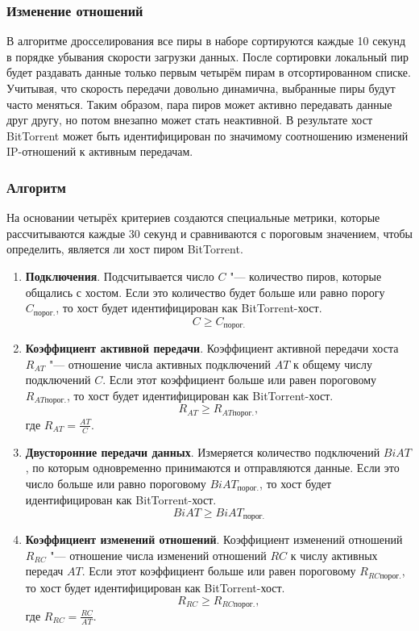 \documentclass[bachelor, och, coursework]{SCWorks}
\begin{document}
\subsubsection{Изменение отношений}
В алгоритме дросселирования все пиры в наборе сортируются каждые 10 секунд в порядке убывания скорости загрузки данных.
После сортировки локальный пир будет раздавать данные только первым четырём пирам в отсортированном списке.
Учитывая, что скорость передачи довольно динамична, выбранные пиры будут часто меняться. Таким образом, пара пиров
может активно передавать данные друг другу, но потом внезапно может стать неактивной. В результате хост BitTorrent может
быть идентифицирован по значимому соотношению изменений IP-отношений к активным передачам.

\subsubsection{Алгоритм}
На основании четырёх критериев создаются специальные метрики, которые рассчитываются каждые 30 секунд
и сравниваются с пороговым значением, чтобы определить, является ли хост пиром BitTorrent. 

\begin{enumerate}
    \item \textbf{Подключения}. Подсчитывается число $C$ "--- количество пиров, которые общались с хостом. Если это количество будет больше или равно порогу $C_{\text{порог.}}$, то хост будет идентифицирован как BitTorrent-хост.
    \[ C \geq C_{\text{порог.}} \]
    
    \item \textbf{Коэффициент активной передачи}. Коэффициент активной передачи хоста $R_{AT}$ "--- отношение числа активных подключений $AT$ к общему числу подключений $C$.
    Если этот коэффициент больше или равен пороговому $R_{AT\text{порог.}}$, то хост будет идентифицирован как BitTorrent-хост.
    \[ R_{AT} \geq R_{AT\text{порог.}}, \]
    где $R_{AT} = \frac{AT}{C}$.

    \item \textbf{Двусторонние передачи данных}. Измеряется количество подключений $BiAT$, по которым одновременно принимаются и отправляются данные. 
    Если это число больше или равно пороговому $BiAT_{\text{порог.}}$, то хост будет идентифицирован как BitTorrent-хост.
    \[ BiAT \geq BiAT_{\text{порог.}} \]

    \item \textbf{Коэффициент изменений отношений}. Коэффициент изменений отношений $R_{RC}$ "--- отношение числа изменений отношений $RC$ к числу активных передач $AT$.
    Если этот коэффициент больше или равен пороговому $R_{RC\text{порог.}}$, то хост будет идентифицирован как BitTorrent-хост.
    \[ R_{RC} \geq R_{RC\text{порог.}}, \]
    где $R_{RC} = \frac{RC}{AT}$.
\end{enumerate}
\end{document}

